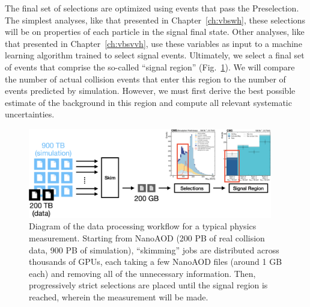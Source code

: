 The final set of selections are optimized using events that pass the Preselection. 
The simplest analyses, like that presented in Chapter~\ref{ch:vbswh}, these selections will be on properties of each particle in the signal final state. 
Other analyses, like that presented in Chapter~\ref{ch:vbsvvh}, use these variables as input to a machine learning algorithm trained to select signal events. 
Ultimately, we select a final set of events that comprise the so-called ``signal region'' (Fig.~\ref{fig:nano_to_SR}). 
We will compare the number of actual collision events that enter this region to the number of events predicted by simulation. 
However, we must first derive the best possible estimate of the background in this region and compute all relevant systematic uncertainties. 

\begin{figure}[htb]
    \centering
    \includegraphics[width=0.95\textwidth]{fig/cms/nano_to_SR.png}
    \caption[Diagram of the data processing workflow for a typical physics measurement]{
        Diagram of the data processing workflow for a typical physics measurement. 
        Starting from NanoAOD (200 PB of real collision data, 900 PB of simulation), ``skimming'' jobs are distributed across thousands of GPUs, each taking a few NanoAOD files (around 1 GB each) and removing all of the unnecessary information. 
        Then, progressively strict selections are placed until the signal region is reached, wherein the measurement will be made. 
    }
    \label{fig:nano_to_SR}
\end{figure}

